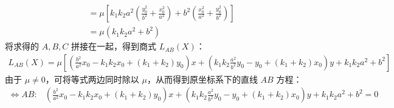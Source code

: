 \begin{solution}
\begin{align*}
    &= \mu \left[ k_1k_2 a^2 \left( \frac{y_0^2}{b^2} + \frac{x_0^2}{a^2} \right) + b^2 \left( \frac{x_0^2}{a^2} + \frac{y_0^2}{b^2} \right) \right] \\
    &= \mu \left( k_1k_2 a^2 + b^2 \right)
\end{align*}
将求得的 $A, B, C$ 拼接在一起，得到商式 $L_{AB}(X)$：
\begin{align*}
    L_{AB}(X) = \mu\left[\left( \frac{b^2}{a^2} x_0 - k_1k_2 x_0 + (k_1+k_2) y_0 \right) x + \left( k_1k_2 \frac{a^2}{b^2} y_0 - y_0 + (k_1+k_2) x_0 \right) y + k_1k_2 a^2 + b^2\right]
\end{align*}
由于 $\mu \neq 0$，可将等式两边同时除以 $\mu$，从而得到原坐标系下的直线 $AB$ 方程：
\begin{align*}
    \Longleftrightarrow AB:&\left( \frac{b^2}{a^2} x_0 - k_1k_2 x_0 + (k_1+k_2) y_0 \right) x + \left( k_1k_2 \frac{a^2}{b^2} y_0 - y_0 + (k_1+k_2) x_0 \right) y + k_1k_2 a^2 + b^2 = 0
\end{align*}
\end{solution}



